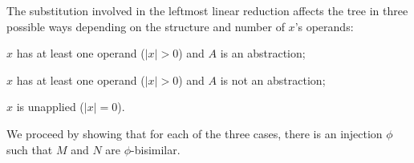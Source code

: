 \documentclass{elsarticle}
\theoremstyle{plain}
\theoremstyle{definition}
\newcommand{\enables}{\vdash} %
\begin{document}
The substitution involved in the leftmost linear reduction affects the tree in three possible ways depending on the structure and number of $x$'s operands:
\begin{description}[itemindent=1em]
    \item[Case 1] $x$ has at least one operand ($|x|>0$) and $A$ is an abstraction;
    \item[Case 2] $x$ has at least one operand ($|x|>0$) and $A$ is not an abstraction;
    \item[Case 3] $x$ is unapplied ($|x|=0$).
\end{description}

%

We proceed by showing that for each of the three cases, there is an injection $\phi$ such that $M$ and $N$ are $\phi$-bisimilar.
\end{document}
